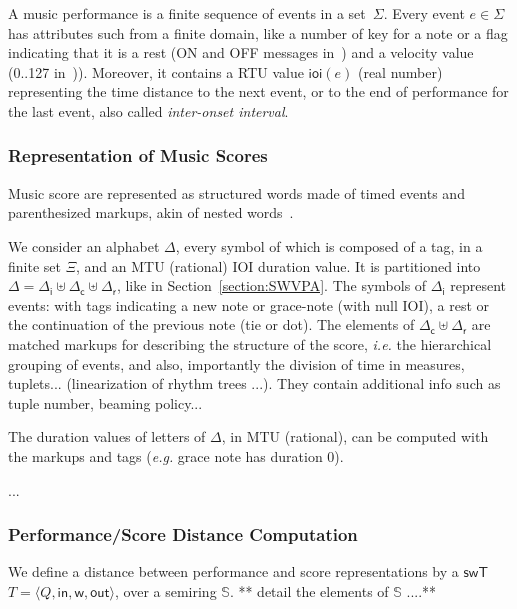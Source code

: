\documentclass[runningheads]{llncs}
\def\ie{\textit{i.e.}\xspace}
\def\eg{\textit{e.g.}\xspace}
\def\<#1>{\langle #1 \rangle}
\newcommand{\Semiring}{\mathbb{S}}
\def\SWT{\textsf{swT}\xspace}
\def\wei{\mathsf{w}}
\def\init{\mathsf{in}}
\def\final{\mathsf{out}}
\def\Deltai{{\Delta_\mathsf{i}}}
\def\Deltac{{\Delta_\mathsf{c}}}
\def\Deltar{{\Delta_\mathsf{r}}}
\newcommand{\ioi}[1]{\mathsf{ioi}({#1})}
\begin{document}
A music performance is a finite sequence of events in a set~$\Sigma$.
Every event $e \in \Sigma$ has attributes such from a finite domain, 
like a number of key for a note 
or a flag indicating that it is a rest 
(\textsf{ON} and \textsf{OFF} messages in~\cite{SMF})
and a velocity value (0..127 in~\cite{SMF})).
Moreover, it contains a RTU value $\ioi{e}$ (real number) 
representing the time distance to the next event, 
or to the end of performance for the last event,
also called \emph{inter-onset interval}.


\subsubsection{Representation of Music Scores}
Music score are represented as structured words
made of timed %
events and parenthesized markups,
akin of nested words~\cite{AlurMadhusudan09nested}.

We consider an alphabet $\Delta$, every symbol of which is 
composed of a tag, in a finite set $\Xi$, 
and an MTU (rational) IOI duration value.
It is partitioned into 
$\Delta = \Deltai \uplus \Deltac \uplus \Deltar$, 
like in Section~\ref{section:SWVPA}.
%
\noindent
The symbols of $\Deltai$ represent events:
with tags indicating a new note or grace-note (with null IOI), 
a rest or the continuation of the previous note (tie or dot).
%
The elements of $\Deltac \uplus \Deltar$ are matched
markups for describing the structure of the score, 
\ie the hierarchical grouping of events, and also, 
importantly the division of time in measures, tuplets...
(linearization of rhythm trees \cite{jacquemard:hal-01138642}...).
They contain additional info such as tuple number, beaming policy...

\noindent
The duration values of letters of $\Delta$, in MTU (rational), 
can be computed with the markups and tags (\eg grace note has duration 0).

%

\begin{example}
...      
\end{example}

\subsubsection{Performance/Score Distance Computation}
\label{app:distance}
We define a distance between performance and score representations
by a $\SWT$ $T = \< Q, \init, \wei, \final >$, over a semiring $\Semiring$.
** detail the elements of $\Semiring$ ....**
\end{document}
